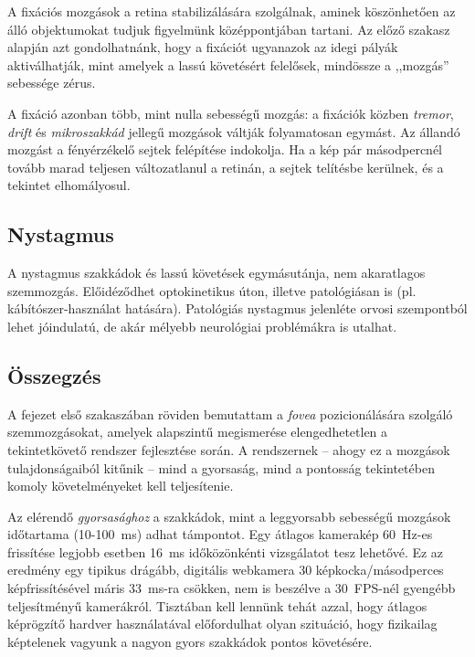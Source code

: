 A fixációs mozgások a retina stabilizálására szolgálnak, aminek köszönhetően az álló objektumokat tudjuk figyelmünk középpontjában tartani. Az előző szakasz alapján azt gondolhatnánk, hogy a fixációt ugyanazok az idegi pályák aktiválhatják, mint amelyek a lassú követésért felelősek, mindössze a ,,mozgás'' sebessége zérus.

A fixáció azonban több, mint nulla sebességű mozgás: a fixációk közben \emph{tremor}, \emph{drift} és \emph{mikroszakkád} jellegű mozgások váltják folyamatosan egymást. Az állandó mozgást a fényérzékelő sejtek felépítése indokolja. Ha a kép pár másodpercnél tovább marad teljesen változatlanul a retinán, a sejtek telítésbe kerülnek, és a tekintet elhomályosul.

\subsection{Nystagmus}\label{sect:nystagmus}

A nystagmus szakkádok és lassú követések egymásutánja, nem akaratlagos szemmozgás. Előidéződhet optokinetikus úton, illetve patológiásan is (pl. kábítószer-használat hatására). Patológiás nystagmus jelenléte orvosi szempontból lehet jóindulatú, de akár mélyebb neurológiai problémákra is utalhat.

\subsection{Összegzés}\label{sect:mozg_osszegzes}

A fejezet első szakaszában röviden bemutattam a \emph{fovea} pozicionálására szolgáló szemmozgásokat, amelyek alapszintű megismerése elengedhetetlen a tekintetkövető rendszer fejlesztése során. A rendszernek -- ahogy ez a mozgások tulajdonságaiból kitűnik -- mind a gyorsaság, mind a pontosság tekintetében komoly követelményeket kell teljesítenie.

Az elérendő \textit{gyorsasághoz} a szakkádok, mint a leggyorsabb sebességű mozgások időtartama (10-100~ms) adhat támpontot. Egy átlagos kamerakép 60~Hz-es frissítése legjobb esetben 16~ms időközönkénti vizsgálatot tesz lehetővé. Ez az eredmény egy tipikus drágább, digitális webkamera 30 képkocka/másodperces képfrissítésével máris 33~ms-ra csökken, nem is beszélve a 30~FPS-nél gyengébb teljesítményű kamerákról. Tisztában kell lennünk tehát azzal, hogy átlagos képrögzítő hardver használatával előfordulhat olyan szituáció, hogy fizikailag képtelenek vagyunk a nagyon gyors szakkádok pontos követésére.

